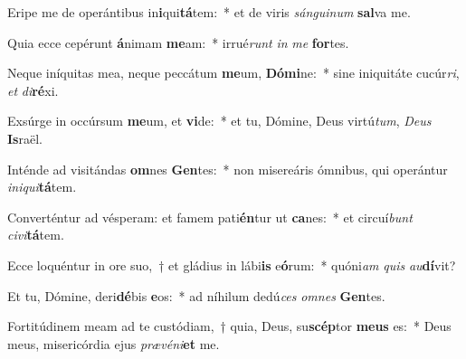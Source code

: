 \item Eripe me de operántibus in\textbf{i}qui\textbf{tá}tem:~* et de viris \textit{sán}\textit{gui}\textit{num} \textbf{sal}va me.
\item Quia ecce cepérunt \textbf{á}nimam \textbf{me}am:~* irrué\textit{runt} \textit{in} \textit{me} \textbf{for}tes.
\item Neque iníquitas mea, neque peccátum \textbf{me}um, \textbf{Dó}\textbf{mi}ne:~* sine iniquitáte cucúr\textit{ri}, \textit{et} \textit{di}\textbf{ré}xi.
\item Exsúrge in occúrsum \textbf{me}um, et \textbf{vi}de:~* et tu, Dómine, Deus virtú\textit{tum}, \textit{De}\textit{us} \textbf{Is}raël.
\item Inténde ad visitándas \textbf{om}nes \textbf{Gen}tes:~* non misereáris ómnibus, qui operántur \textit{in}\textit{i}\textit{qui}\textbf{tá}tem.
\item Converténtur ad vésperam: et famem pati\textbf{én}tur ut \textbf{ca}nes:~* et circuí\textit{bunt} \textit{ci}\textit{vi}\textbf{tá}tem.
\item Ecce loquéntur in ore suo,~† et gládius in lábi\textbf{is} e\textbf{ó}rum:~* quóni\textit{am} \textit{quis} \textit{au}\textbf{dí}vit?
\item Et tu, Dómine, deri\textbf{dé}bis \textbf{e}os:~* ad níhilum dedú\textit{ces} \textit{om}\textit{nes} \textbf{Gen}tes.
\item Fortitúdinem meam ad te custódiam,~† quia, Deus, su\textbf{scép}tor \textbf{me}\textbf{us} es:~* Deus meus, misericórdia ejus \textit{præ}\textit{vé}\textit{ni}\textbf{et} me.
